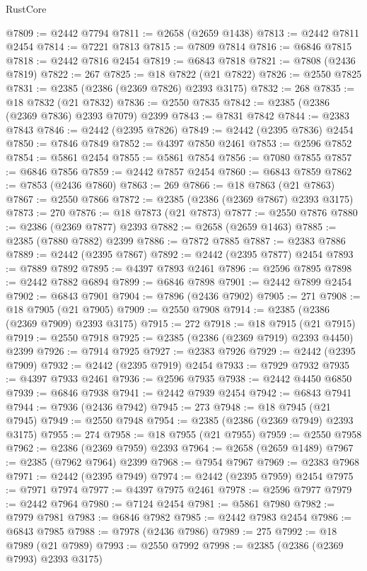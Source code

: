 \begin{lexlean}{RustCore}
\begin{coremodule}
@7809 := @2442 @7794
@7811 := @2658 (@2659 @1438)
@7813 := @2442 @7811 @2454
@7814 := @7221 @7813
@7815 := @7809 @7814
@7816 := @6846 @7815
@7818 := @2442 @7816 @2454
@7819 := @6843 @7818
@7821 := @7808 (@2436 @7819)
@7822 := 267
@7825 := @18 @7822 (@21 @7822)
@7826 := @2550 @7825
@7831 := @2385 (@2386 (@2369 @7826) @2393 @3175)
@7832 := 268
@7835 := @18 @7832 (@21 @7832)
@7836 := @2550 @7835
@7842 := @2385 (@2386 (@2369 @7836) @2393 @7079) @2399
@7843 := @7831 @7842
@7844 := @2383 @7843
@7846 := @2442 (@2395 @7826)
@7849 := @2442 (@2395 @7836) @2454
@7850 := @7846 @7849
@7852 := @4397 @7850 @2461
@7853 := @2596 @7852
@7854 := @5861 @2454
@7855 := @5861 @7854
@7856 := @7080 @7855
@7857 := @6846 @7856
@7859 := @2442 @7857 @2454
@7860 := @6843 @7859
@7862 := @7853 (@2436 @7860)
@7863 := 269
@7866 := @18 @7863 (@21 @7863)
@7867 := @2550 @7866
@7872 := @2385 (@2386 (@2369 @7867) @2393 @3175)
@7873 := 270
@7876 := @18 @7873 (@21 @7873)
@7877 := @2550 @7876
@7880 := @2386 (@2369 @7877) @2393
@7882 := @2658 (@2659 @1463)
@7885 := @2385 (@7880 @7882) @2399
@7886 := @7872 @7885
@7887 := @2383 @7886
@7889 := @2442 (@2395 @7867)
@7892 := @2442 (@2395 @7877) @2454
@7893 := @7889 @7892
@7895 := @4397 @7893 @2461
@7896 := @2596 @7895
@7898 := @2442 @7882 @6894
@7899 := @6846 @7898
@7901 := @2442 @7899 @2454
@7902 := @6843 @7901
@7904 := @7896 (@2436 @7902)
@7905 := 271
@7908 := @18 @7905 (@21 @7905)
@7909 := @2550 @7908
@7914 := @2385 (@2386 (@2369 @7909) @2393 @3175)
@7915 := 272
@7918 := @18 @7915 (@21 @7915)
@7919 := @2550 @7918
@7925 := @2385 (@2386 (@2369 @7919) @2393 @4450) @2399
@7926 := @7914 @7925
@7927 := @2383 @7926
@7929 := @2442 (@2395 @7909)
@7932 := @2442 (@2395 @7919) @2454
@7933 := @7929 @7932
@7935 := @4397 @7933 @2461
@7936 := @2596 @7935
@7938 := @2442 @4450 @6850
@7939 := @6846 @7938
@7941 := @2442 @7939 @2454
@7942 := @6843 @7941
@7944 := @7936 (@2436 @7942)
@7945 := 273
@7948 := @18 @7945 (@21 @7945)
@7949 := @2550 @7948
@7954 := @2385 (@2386 (@2369 @7949) @2393 @3175)
@7955 := 274
@7958 := @18 @7955 (@21 @7955)
@7959 := @2550 @7958
@7962 := @2386 (@2369 @7959) @2393
@7964 := @2658 (@2659 @1489)
@7967 := @2385 (@7962 @7964) @2399
@7968 := @7954 @7967
@7969 := @2383 @7968
@7971 := @2442 (@2395 @7949)
@7974 := @2442 (@2395 @7959) @2454
@7975 := @7971 @7974
@7977 := @4397 @7975 @2461
@7978 := @2596 @7977
@7979 := @2442 @7964
@7980 := @7124 @2454
@7981 := @5861 @7980
@7982 := @7979 @7981
@7983 := @6846 @7982
@7985 := @2442 @7983 @2454
@7986 := @6843 @7985
@7988 := @7978 (@2436 @7986)
@7989 := 275
@7992 := @18 @7989 (@21 @7989)
@7993 := @2550 @7992
@7998 := @2385 (@2386 (@2369 @7993) @2393 @3175)

\end{coremodule}
\end{lexlean}
